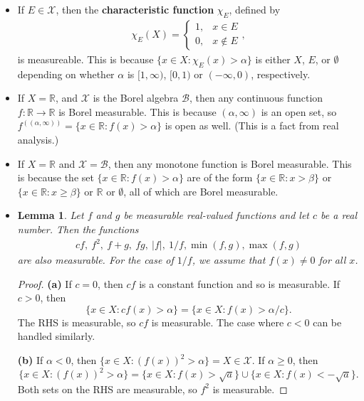 \documentclass[10pt]{article}
\newtheorem{lemma}{Lemma}
\newcommand{\mcal}[1]{\mathcal{#1}}
\newcommand{\Real}{\mathbb{R}}
\begin{document}
\begin{itemize}
  \item If $E \in \mcal{X}$, then the {\bf characteristic function} $\chi_E$, defined by
  \begin{align*}
    \chi_E(X) = \begin{cases}
      1, & x \in E \\
      0, & x \not\in E
    \end{cases},
  \end{align*}
  is measureable. This is because $\{ x \in X : \chi_E(x) > \alpha \}$ is either $X$, $E$, or $\emptyset$ depending on whether $\alpha$ is $[1,\infty)$, $[0,1)$ or $(-\infty,0)$, respectively.

  \item If $X = \Real$, and $\mcal{X}$ is the Borel algebra $\mcal{B}$, then any continuous function $f: \Real \rightarrow \Real$ is Borel measurable. This is because $(\alpha,\infty)$ is an open set, so $f^((\alpha,\infty)) = \{ x \in \Real : f(x) > \alpha \}$ is open as well. (This is a fact from real analysis.)
  
  \item If $X = \Real$ and $\mcal{X} = \mcal{B}$, then any monotone function is Borel measurable. This is because the set   $\{ x \in \Real : f(x) > \alpha \}$ are of the form $\{ x \in \Real : x > \beta \}$ or $\{ x \in \Real : x \geq \beta \}$ or $\Real$ or $\emptyset$, all of which are Borel measurable.
  
  \item \begin{lemma}
    Let $f$ and $g$ be measurable real-valued functions and let $c$ be a real number. Then the functions
    \begin{align*}
      cf,\ f^2,\ f+g,\ fg,\ |f|,\ 1/f, \min(f,g), \max(f,g)
    \end{align*}
    are also measurable. For the case of $1/f$, we assume that $f(x) \neq 0$ for all $x$.
  \end{lemma}

  \begin{proof}
    {\bf (a)} If $c = 0$, then $cf$ is a constant function and so is measurable. If $c > 0$, then $$\{x \in X : c f(x) > \alpha\} = \{x \in X : f(x) > \alpha / c\}.$$ The RHS is measurable, so $cf$ is measurable. The case where $c < 0$ can be handled similarly.

    {\bf (b)} If $\alpha < 0$, then $\{x \in X : (f(x))^2 > \alpha\} = X \in \mcal{X}$. If $\alpha \geq 0$, then 
    $$\{x \in X : (f(x))^2 > \alpha\} 
    = \{x \in X : f(x) > \sqrt{a} \} \cup \{x \in X : f(x) < -\sqrt{a} \}.$$
    Both sets on the RHS are measurable, so $f^2$ is measurable.


\end{proof}
\end{itemize}
\end{document}
